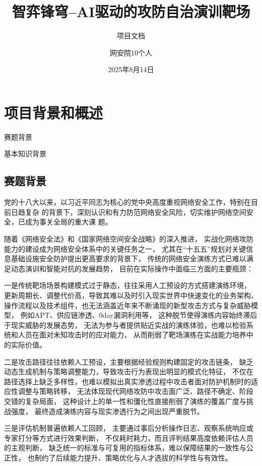 \documentclass[lang=cn,10pt]{elegantbook}
\title{智弈锋穹--AI驱动的攻防自治演训靶场}
\subtitle{项目文档}
\author{网安院10个人}
\institute{武汉大学 国家网络安全学院}
\date{2025年8月14日}
\begin{document}
\maketitle
\frontmatter

\tableofcontents

\mainmatter


\chapter{项目背景和概述}
\begin{introduction}
    \item 赛题背景
    \item 基本知识背景
\end{introduction}

\section{赛题背景}

党的十八大以来，以习近平同志为核心的党中央高度重视网络安全工作，特别在目前日趋复杂
的背景下，深刻认识和有力防范网络安全风险，切实维护网络空间安全，已成为事关全局的重大课
题。

随着《网络安全法》和《国家网络空间安全战略》的深入推进，
实战化网络攻防能力的建设成为网络安全体系中的关键任务之一，
尤其在“十五五”规划对关键信息基础设施安全防护提出更高要求的背景下，
传统的网络安全演练方式已难以满足动态演训和智能对抗的发展趋势，
目前在实际操作中面临三方面的主要瓶颈：

一是传统靶场场景构建模式过于静态，往往采用人工预设的方式搭建演练环境，
更新周期长、调整代价高，导致其难以及时引入现实世界中快速变化的业务架构、
操作流程以及技术组件，也无法涵盖近年来不断涌现的新型攻击方式与复杂威胁模型，
例如APT、供应链渗透、0day漏洞利用等，
这种脱节使得演练内容始终滞后于现实威胁的发展态势，
无法为参与者提供贴近实战的演练体验，也难以检验系统和人员在面对未知攻击时的应对能力，
从而削弱了靶场演练在实战能力培养中的实际价值。

二是攻击路径往往依赖人工预设，主要根据经验规则构建固定的攻击链条，
缺乏动态生成机制与策略调整能力，导致攻击行为表现出明显的模式化特征，
不仅在路径选择上缺乏多样性，也难以模拟出真实渗透过程中攻击者面对防护机制时的适应性调整与策略转移，
无法体现现代网络攻防中攻击面广泛、路径不确定、阶段交错的复杂局面，
这种设计上的单一性和僵化性直接削弱了演练的覆盖广度与挑战强度，
最终造成演练内容与现实渗透行为之间出现严重脱节。

三是评估机制普遍依赖人工回顾，
主要通过事后分析操作日志、观察系统响应或专家打分等方式进行效果判断，
不仅耗时耗力，而且评判结果高度依赖评估人员的主观判断，
缺乏统一的标准与可复用的指标体系，难以保障结果的一致性与公正性，
也制约了后续能力提升、策略优化与人才选拔的科学性与有效性。
\end{document}
